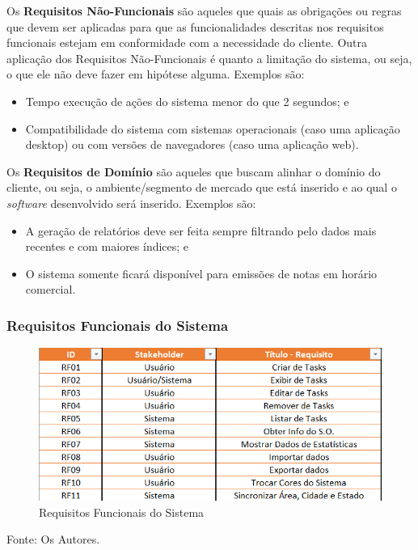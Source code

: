 \documentclass[a4paper,12pt]{article}
\begin{document}
Os \textbf{Requisitos Não-Funcionais} são aqueles que quais as obrigações ou regras que devem ser aplicadas para que as 
funcionalidades descritas nos requisitos funcionais estejam em conformidade com a necessidade do cliente.
Outra aplicação dos Requisitos Não-Funcionais é quanto a limitação do sistema, ou seja, o que ele não deve fazer 
em hipótese alguma. Exemplos são:
\begin{itemize}
	\item Tempo execução de ações do sistema menor do que 2 segundos; e
	\item Compatibilidade do sistema com sistemas operacionais (caso uma aplicação desktop) ou com versões de 
	navegadores (caso uma aplicação web).
\end{itemize}

\vspace{1cm}
Os \textbf{Requisitos de Domínio} são aqueles que buscam alinhar o domínio do cliente, ou seja, o ambiente/segmento de 
mercado que está inserido e ao qual o \textit{software} desenvolvido será inserido. Exemplos são:
\begin{itemize}
	\item A geração de relatórios deve ser feita sempre filtrando pelo dados mais recentes e com maiores índices; e
	\item O sistema somente ficará disponível para emissões de notas em horário comercial.
\end{itemize}

\subsubsection{Requisitos Funcionais do Sistema}
\begin{figure}[H]
	\centering
	\includegraphics[scale=0.80]{requirements/functionals/requirements.png}
	\caption{Requisitos Funcionais do Sistema}
\end{figure}
\noindent Fonte: Os Autores.
\end{document}
